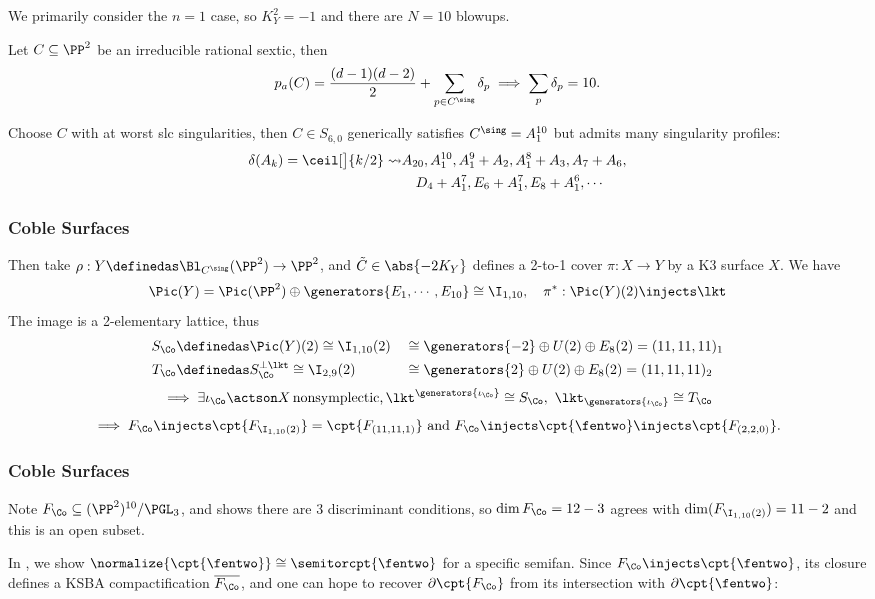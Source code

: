 \documentclass{beamer}
\begin{document}
{\begin{frame}
We primarily consider the $n=1$ case, so $K_Y^2 = -1$ and there are $N=10$ blowups.
\begin{construction}
Let $C \subseteq \PP^2$ be an irreducible rational sextic, then
\[
p_a(C) = { (d-1)(d-2)\over 2 } + \sum_{p\in C^\sing} \delta_p \implies \sum_p \delta_p = 10
.\]
\end{construction}
Choose $C$ with at worst slc singularities, then $C \in S_{6, 0}$ generically satisfies $C^\sing = A_1^{10}$ but admits many singularity profiles:
{\small
\begin{align*}
\delta(A_k) = \ceil[\big]{k/2} \leadsto & A_{20}, A_1^{10}, A_1^9 + A_2, A_1^8 + A_3, A_7 + A_6,  \\
&\quad  D_4 + A_1^7, E_6 + A_1^7, E_8 + A_1^6, \cdots
\end{align*}
}
\end{frame}
\begin{frame}\frametitle{Coble Surfaces}
Then take $\rho: Y \definedas \Bl_{C^\sing}(\PP^2) \to \PP^2$, and $\tilde C \in\abs{-2K_Y}$ defines a 2-to-1 cover $\pi: X\to Y$ by a K3 surface $X$. We have
\[
\Pic(Y) = \Pic(\PP^2) \oplus \generators{E_1, \cdots, E_{10}} \cong \I_{1, 10}, \quad 
\pi^*: \Pic(Y)(2) \injects \lkt
\]
The image is a 2-elementary \cite{Nik79a} lattice, thus
\begin{align*}
S_{\Co} &\definedas \Pic(Y)(2) \cong \I_{1, 10}(2) &&\cong \generators{-2} \oplus U(2) \oplus E_8(2) = (11,11,11)_1 \\
T_{\Co} &\definedas S_{\Co}^{\perp \lkt} \cong \I_{2, 9}(2) &&\cong \generators{2} \oplus U(2) \oplus E_8(2) = (11,11,11)_2
\end{align*}
\[
\implies \exists \iota_{\Co}\actson X \,\text{nonsymplectic,}\,
\lkt^{\generators{\iota_{\Co}}} \cong S_{\Co},\,\,  \lkt_{\generators{\iota_{\Co}}} \cong T_{\Co}
\]
\[
\implies F_{\Co} \injects \cpt{ F_{\I_{1, 10}(2)} } = \cpt{ F_{(11,11,1)} } \text{ and } F_{\Co} \injects \cpt{ \fentwo } \injects \cpt{F_{(2,2,0)}}
.\]
\end{frame}

\begin{frame}\frametitle{Coble Surfaces}
Note $F_{\Co} \subseteq (\PP^2)^{10}/\PGL_3$, and \cite{Cob19} shows there are 3 discriminant conditions, so $\dim{F_{\Co}} = 12-3$ agrees with $\dim( F_{\I_{1, 10}(2)} ) = 11-2$ and this is an open subset.

\begin{goal}
In \cite{AEGS23}, we show $\normalize{ \cpt{\fentwo} } \cong \semitorcpt{\fentwo}$ for a specific semifan.
Since $F_{\Co} \injects \cpt{\fentwo}$, its closure defines a KSBA compactification $\overline{F_{\Co}}$, and one can hope to recover $\partial \cpt{ F_{\Co}}$ from its intersection with $\partial \cpt{\fentwo}$:
\end{goal}


\end{frame}}
\end{document}
